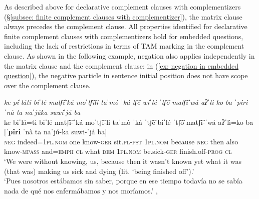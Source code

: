     \z
\z

As described above for declarative complement clauses with complementizers (§\ref{subsec: finite complement clauses with complementizer}), the matrix clause always precedes the complement clause. All properties identified for declarative finite complement clauses with complementizers hold for embedded questions, including the lack of restrictions in terms of TAM marking in the complement clause. As shown in the following example, negation also applies independently in the matrix clause and the complement clause: in (\ref{ex: negation in embedded question}), the negative particle in sentence initial position does not have scope over the complement clause.

\ea\label{ex: negation in embedded question}

    \textit{ke piˈláti biˈlé matʃ͡iˈká moˈtʃ͡íli taˈmò ˈká tʃ͡è wiˈlé ˈtʃ͡ó matʃ͡iˈwá aʔˈlì ko ba ˈpîri ˈnà ta naˈjúka suwiˈjá ba}\\
    \gll    ke biˈlá=ti biˈlé matʃ͡i-ˈká moˈtʃ͡í-li taˈmò ˈká ˈtʃ͡è biˈlé ˈtʃ͡ó matʃ͡i-ˈwá aʔˈlì=ko ba [\textbf{ˈpîri} ˈnà ta naˈjú-ka suwi-ˈjá ba]\\
            \textsc{neg} indeed=\textsc{1pl.nom} one know-\textsc{ger} sit.\textsc{pl-pst} \textsc{1pl.nom} because \textsc{neg} then also know-\textsc{mpass} and=\textsc{emph} \textsc{cl} {what} \textsc{dem} \textsc{1pl.nom} be.sick-\textsc{ger} finish.off-\textsc{prog} \textsc{cl}\\
    \glt    `We were without knowing, us, because then it wasn't known yet what it was (that was) making us sick and dying (lit. `being finished off').'\\
    \glt    `Pues nosotros estábamos sin saber, porque en ese tiempo todavía no se sabía nada de qué nos enfermábamos y nos moríamos.'  , \\

